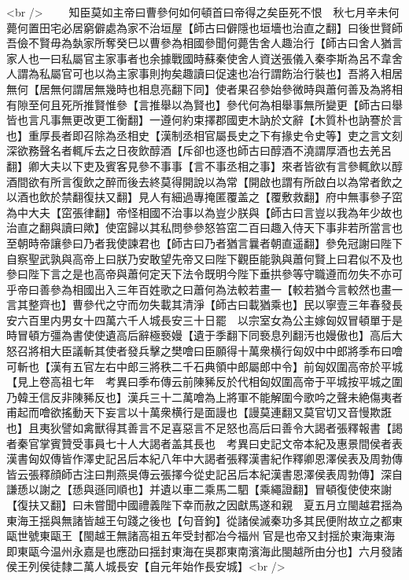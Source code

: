 <br />
　　知臣莫如主帝曰曹參何如何頓首曰帝得之矣臣死不恨　秋七月辛未何薨何置田宅必居窮僻處為家不治垣屋【師古曰僻隱也垣墻也治直之翻】曰後世賢師吾儉不賢毋為埶家所奪癸巳以曹參為相國參聞何薨吿舍人趣治行【師古曰舍人猶言家人也一曰私屬官主家事者也余據戰國時蘇秦使舍人資送張儀入秦李斯為呂不韋舍人謂為私屬官可也以為主家事則拘矣趣讀曰促速也冶行謂飭治行裝也】吾將入相居無何【居無何謂居無幾時也相息亮翻下同】使者果召參始參微時與蕭何善及為將相有隙至何且死所推賢惟參【言推舉以為賢也】參代何為相舉事無所變更【師古曰舉皆也言凡事無更改更工衡翻】一遵何約束擇郡國吏木訥於文辭【木質朴也訥謇於言也】重厚長者即召除為丞相史【漢制丞相官屬長史之下有掾史令史等】吏之言文刻深欲務聲名者輒斥去之日夜飲醇酒【斥卻也逐也師古曰醇酒不澆謂厚酒也去羌呂翻】卿大夫以下吏及賓客見參不事事【言不事丞相之事】來者皆欲有言參輒飲以醇酒間欲有所言復飲之醉而後去終莫得開說以為常【開啟也謂有所啟白以為常者飲之以酒也飲於禁翻復扶又翻】見人有細過專掩匿覆盖之【覆敷救翻】府中無事參子窋為中大夫【窋張律翻】帝怪相國不治事以為豈少朕與【師古曰言豈以我為年少故也治直之翻與讀曰歟】使窋歸以其私問參參怒笞窋二百曰趣入侍天下事非若所當言也至朝時帝讓參曰乃者我使諫君也【師古曰乃者猶言曩者朝直遥翻】參免冠謝曰陛下自察聖武孰與高帝上曰朕乃安敢望先帝又曰陛下觀臣能孰與蕭何賢上曰君似不及也參曰陛下言之是也高帝與蕭何定天下法令既明今陛下垂拱參等守職遵而勿失不亦可乎帝曰善參為相國出入三年百姓歌之曰蕭何為法較若畫一【較若猶今言較然也畫一言其整齊也】曹參代之守而勿失載其清淨【師古曰載猶乘也】民以寧壹三年春發長安六百里内男女十四萬六千人城長安三十日罷　以宗室女為公主嫁匈奴冒頓單于是時冒頓方彊為書使使遺高后辭極䙝嫚【遺于季翻下同䙝息列翻汚也嫚傲也】高后大怒召將相大臣議斬其使者發兵擊之樊噲曰臣願得十萬衆横行匈奴中中郎將季布曰噲可斬也【漢有五官左右中郎三將秩二千石典領中郎屬郎中令】前匈奴圍高帝於平城【見上卷高祖七年　考異曰季布傳云前陳豨反於代相匈奴圍高帝于平城按平城之圍乃韓王信反非陳豨反也】漢兵三十二萬噲為上將軍不能解圍今歌吟之聲未絶傷夷者甫起而噲欲搖動天下妄言以十萬衆横行是面謾也【謾莫連翻又莫官切又音慢欺誑也】且夷狄譬如禽獸得其善言不足喜惡言不足怒也高后曰善令大謁者張釋報書【謁者秦官掌賓贊受事員七十人大謁者盖其長也　考異曰史記文帝本紀及惠景間侯者表漢書匈奴傳皆作澤史記呂后本紀八年中大謁者張釋漢書紀作釋卿恩澤侯表及周勃傳皆云張釋顔師古注曰荆燕吳傳云張擇今從史記呂后本紀漢書恩澤侯表周勃傳】深自謙愻以謝之【愻與遜同順也】并遺以車二乘馬二駟【乘繩證翻】冒頓復使使來謝【復扶又翻】曰未嘗聞中國禮義陛下幸而赦之因獻馬遂和親　夏五月立閩越君揺為東海王揺與無諸皆越王句踐之後也【句音鉤】從諸侯滅秦功多其民便附故立之都東甌世號東甌王【閩越王無諸高祖五年受封都冶今福州官是也帝又封揺於東海東海即東甌今温州永嘉是也應劭曰揺封東海在吳郡東南濱海此閩越所由分也】六月發諸侯王列侯徒隸二萬人城長安【自元年始作長安城】<br />
